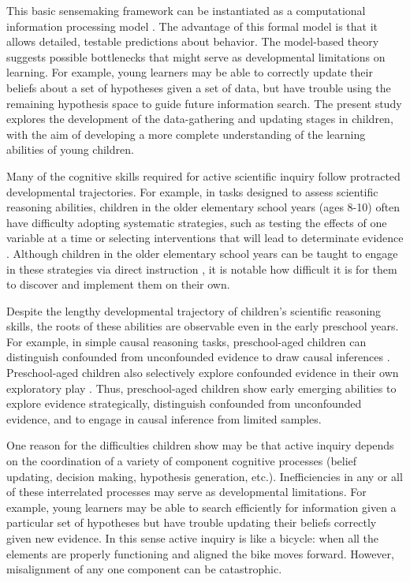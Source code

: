 \documentclass[man,floatsintext]{apa6}
\begin{document}
This basic sensemaking framework can be instantiated as a computational 
information processing model \cite{Gureckis:2012,Gureckis:2009,Markant:2012}. 
The advantage of this formal model is that it allows detailed, testable predictions 
about behavior. The model-based theory suggests possible bottlenecks that might 
serve as developmental limitations on learning. For example, young learners may be 
able to correctly update their beliefs about a set of hypotheses given a set of data, 
but have trouble using the remaining hypothesis space to guide future information 
search. The present study explores the development of the data-gathering and updating 
stages in children, with the aim of developing a more complete understanding of the 
learning abilities of young children.

Many of the cognitive skills required for active scientific inquiry follow protracted 
developmental trajectories. For example, in tasks designed to assess scientific 
reasoning abilities, children in the older elementary school years (ages 8-10) often 
have difficulty adopting systematic strategies, such as testing the effects of one 
variable at a time or selecting interventions that will lead to determinate evidence 
\cite{Chen:1999}. Although children in the older elementary school years can be 
taught to engage in these strategies via direct instruction \cite{Klahr:2004,Kuhn:2005}, 
it is notable how difficult it is for them to discover and implement them on 
their own. 

Despite the lengthy developmental trajectory of children's scientific reasoning 
skills, the roots of these abilities are observable even in the early preschool years. 
For example, in simple causal reasoning tasks, preschool-aged children can 
distinguish confounded from unconfounded evidence to draw causal inferences 
\cite{Gopnik:2001,Kushnir:2005,Kushnir:2007,Schulz:2004}. Preschool-aged 
children also selectively explore confounded evidence in their own exploratory play 
\cite{Cook:2011,Gweon:2008,Schulz:2007}. Thus, preschool-aged children show 
early emerging abilities to explore evidence strategically, distinguish confounded 
from unconfounded evidence, and to engage in causal inference from limited 
samples.

One reason for the difficulties children show may be that 
active inquiry depends on the coordination of a variety of 
component cognitive processes (belief updating, decision making, hypothesis generation, etc.).  
Inefficiencies in any or all of these interrelated processes may serve as developmental limitations.  
For example, young learners may be able to search efficiently for information given a particular 
set of hypotheses but have trouble updating their beliefs correctly given new evidence.
In this sense active inquiry is like a bicycle: when all the elements are properly functioning
and aligned the bike moves forward.  However, misalignment of any one component can
be catastrophic.
\end{document}
